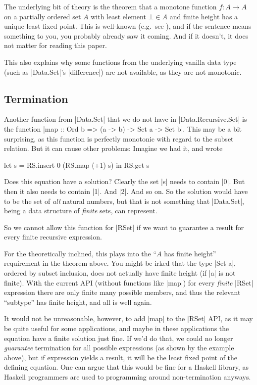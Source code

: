 \documentclass[manuscript,anonymous,screen,acmsmall]{acmart}
\begin{document}
The underlying bit of theory is the theorem that a monotone function $f : A \to A$ on a partially ordered set $A$ with least element $\bot \in A$ and finite height has a unique least fixed point. This is well-known (e.g.\ see \citep{lazyleast}), and if the sentence means something to you, you probably already saw it coming. And if it doesn't, it does not matter for reading this paper.

This also explains why some functions from the underlying vanilla data type (such as |Data.Set|'s |difference|) are not available, as they are not monotonic.

\subsection{Termination}

Another function from |Data.Set| that we do not have in |Data.Recursive.Set| is the function |map :: Ord b => (a -> b) -> Set a -> Set b|. This may be a bit surprising, as this function is perfectly monotonic with regard to the subset relation. But it can cause other problems: Imagine we had it, and wrote
\begin{code}
let s = RS.insert 0 (RS.map (+1) s) in RS.get s
\end{code}
Does this equation have a solution? Clearly the set |s| needs to contain |0|. But then it also needs to contain |1|. And |2|. And so on. So the solution would have to be the set of \emph{all} natural numbers, but that is not something that |Data.Set|, being a data structure of \emph{finite} sets, can represent.

So we cannot allow this function for |RSet| if we want to guarantee a result for every finite recursive expression.

For the theoretically inclined, this plays into the “$A$ has finite height” requirement in the theorem above. You might be irked that the type |Set a|, ordered by subset inclusion, does not actually have finite height (if |a| is not finite). With the current API (without functions like |map|) for every \emph{finite} |RSet| expression there are only finite many possible members, and thus the relevant “subtype” has finite height, and all is well again.

It would not be unreasonable, however, to add |map| to the |RSet| API, as it may be quite useful for some applications, and maybe in these applications the equation have a finite solution just fine. If we'd do that, we could no longer \emph{guarantee} termination for all possible expressions (as shown by the example above), but if expression yields a result, it will be the least fixed point of the defining equation. One can argue that this would be fine for a Haskell library, as Haskell programmers are used to programming around non-termination anyways.
\end{document}
